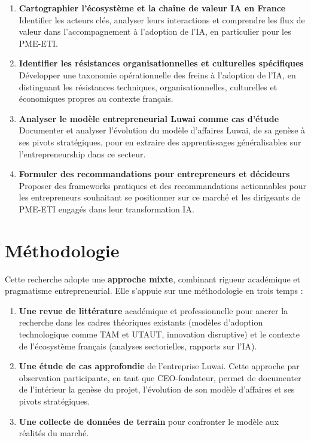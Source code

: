 \begin{enumerate}
    \item \textbf{Cartographier l'écosystème et la chaîne de valeur IA en France}\\
    Identifier les acteurs clés, analyser leurs interactions et comprendre les flux de valeur dans l'accompagnement à l'adoption de l'IA, en particulier pour les PME-ETI.
    \item \textbf{Identifier les résistances organisationnelles et culturelles spécifiques}\\
    Développer une taxonomie opérationnelle des freins à l'adoption de l'IA, en distinguant les résistances techniques, organisationnelles, culturelles et économiques propres au contexte français.
    \item \textbf{Analyser le modèle entrepreneurial Luwai comme cas d'étude}\\
    Documenter et analyser l'évolution du modèle d'affaires Luwai, de sa genèse à ses pivots stratégiques, pour en extraire des apprentissages généralisables sur l'entrepreneurship dans ce secteur.
    \item \textbf{Formuler des recommandations pour entrepreneurs et décideurs}\\
    Proposer des frameworks pratiques et des recommandations actionnables pour les entrepreneurs souhaitant se positionner sur ce marché et les dirigeants de PME-ETI engagés dans leur transformation IA.
\end{enumerate}

\section{Méthodologie}

Cette recherche adopte une \textbf{approche mixte}, combinant rigueur académique et pragmatisme entrepreneurial. Elle s'appuie sur une méthodologie en trois temps :

\begin{enumerate}
    \item \textbf{Une revue de littérature} académique et professionnelle pour ancrer la recherche dans les cadres théoriques existants (modèles d'adoption technologique comme TAM et UTAUT, innovation disruptive) et le contexte de l'écosystème français (analyses sectorielles, rapports sur l'IA).

    \item \textbf{Une étude de cas approfondie} de l'entreprise Luwai. Cette approche par observation participante, en tant que CEO-fondateur, permet de documenter de l'intérieur la genèse du projet, l'évolution de son modèle d'affaires et ses pivots stratégiques.

    \item \textbf{Une collecte de données de terrain} pour confronter le modèle aux réalités du marché.
\end{enumerate}

